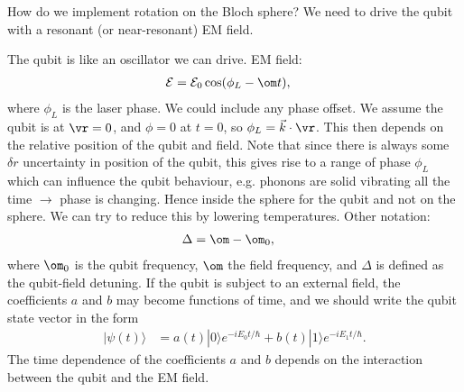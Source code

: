 \documentclass[lasers.tex]{subfiles}
\begin{document}
\chapter{}
How do we implement rotation on the Bloch sphere?
We need to drive the qubit with a resonant (or near-resonant) EM field. 
\begin{figure}[H]
    \centering
\end{figure}
The qubit is like an oscillator we can drive. 
EM field:
\begin{align}
    \mathcal{E} &= \mathcal{E}_0\cos(\phi_L-\om t),
\end{align}
where $\phi_L$ is the laser phase.
We could include any phase offset. 
We assume the qubit is at $\vr=0$, and $\phi=0$ at $t=0$, so $\phi_L=\vec{k}\cdot\vr$.
This then depends on the relative position of the qubit and field. 
Note that since there is always some $\delta r$ uncertainty in position of the qubit, this gives rise to a range of phase $\phi_L$ which can influence the qubit behaviour, e.g. phonons are solid vibrating all the time $\to$ phase is changing. 
Hence inside the sphere for the qubit and not on the sphere. 
We can try to reduce this by lowering temperatures. 
Other notation:
\begin{align}
    \Delta &= \om-\om_0,
\end{align}
where $\om_0$ is the qubit frequency, $\om$ the field frequency, and $\Delta$ is defined as the qubit-field detuning. 
If the qubit is subject to an external field, the coefficients $a$ and $b$ may become functions of time, and we should write the qubit state vector in the form
\begin{align}
    |\psi(t)\rangle &= a(t)|0\rangle e^{-iE_0t/\hbar} + b(t)|1\rangle e^{-iE_1t/\hbar}.
\end{align}
The time dependence of the coefficients $a$ and $b$ depends on the interaction between the qubit and the EM field. 
\end{document}
